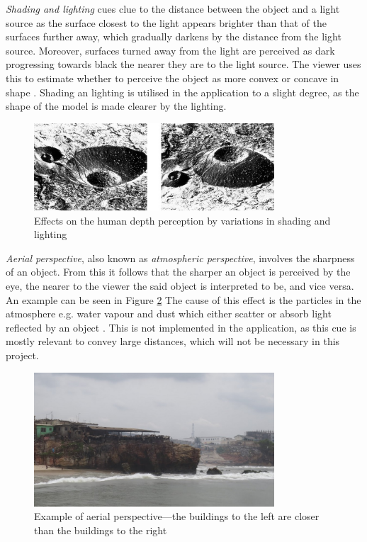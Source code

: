 \textit{Shading and lighting} cues clue to the distance between the object and a light source as the surface closest to the light appears brighter than that of the surfaces further away, which gradually darkens by the distance from the light source. Moreover, surfaces turned away from the light are perceived as dark progressing towards black the nearer they are to the light source. The viewer uses this to estimate whether to perceive the object as more convex or concave in shape \cite{Gale}. Shading an lighting is utilised in the application to a slight degree, as the shape of the model is made clearer by the lighting.

\begin{figure}[h!]
   \centering
   \includegraphics[width=0.8\textwidth]{figures/cue1.jpg}
   \caption{Effects on the human depth perception by variations in shading and lighting \cite{Heeger}}\label{fig:cue1}
\end{figure}

\textit{Aerial perspective}, also known as \textit{atmospheric perspective},  involves the sharpness of an object. From this it follows that the sharper an object is perceived by the eye, the nearer to the viewer the said object is interpreted to be, and vice versa. An example can be seen in Figure \ref{fig:cue2} The cause of this effect is the particles in the atmosphere e.g. water vapour and dust which either scatter or absorb light reflected by an object \cite{Gale}. This is not implemented in the application, as this cue is mostly relevant to convey large distances, which will not be necessary in this project.

\begin{figure}[h!]
   \centering
   \includegraphics[width=0.8\textwidth]{figures/cue2.jpg}
   \caption{Example of aerial perspective---the buildings to the left are closer than the buildings to the right}\label{fig:cue2}
\end{figure}

